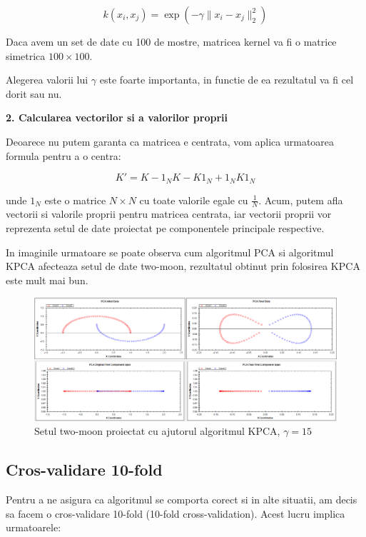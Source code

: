 \documentclass[12pt,oneside]{article}
\begin{document}
\begin{equation}
k(x_i,x_j)=\exp(-\gamma \|x_i - x_j\|_2^2)
\end{equation}

Daca avem un set de date cu 100 de mostre, matricea kernel va fi o matrice simetrica $100 \times 100$.

Alegerea valorii lui $\gamma$ este foarte importanta, in functie de ea rezultatul va fi cel dorit sau nu.

\textbf{2. Calcularea vectorilor si a valorilor proprii}

Deoarece nu putem garanta ca matricea e centrata, vom aplica urmatoarea formula pentru a o centra: 

\begin{equation}
K'=K-1_NK-K1_N+1_NK1_N
\end{equation}

unde $1_N$ este o matrice $N \times N$ cu toate valorile egale cu $\frac{1}{N}$.
Acum, putem afla vectorii si valorile proprii pentru matricea centrata, iar vectorii proprii vor reprezenta setul de date proiectat pe componentele principale respective.

In imaginile urmatoare se poate observa cum algoritmul PCA si algoritmul KPCA afecteaza setul de date two-moon, rezultatul obtinut prin folosirea KPCA este mult mai bun. 


\begin{figure}[H]
\centering
\caption{Setul two-moon proiectat cu ajutorul algoritmul KPCA, $\gamma =15$}
\includegraphics[width=\linewidth]{twomoon1}
\end{figure}

\subsection{Cros-validare 10-fold}
Pentru a ne asigura ca algoritmul se comporta corect si in alte situatii, am decis sa facem o cros-validare 10-fold (10-fold cross-validation). Acest lucru implica urmatoarele: 
\end{document}

